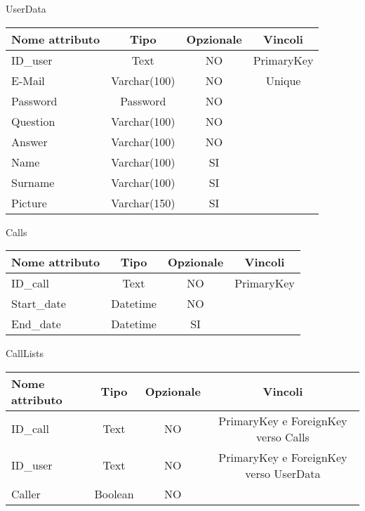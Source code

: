 \begin{center}

UserData

\begin{center}
\begin{tabular}{lccc}
\toprule
Nome attributo & Tipo & Opzionale & Vincoli\\
\midrule %
ID\_user & Text & NO & PrimaryKey\\
E-Mail & Varchar(100) & NO & Unique\\
Password & Password & NO &\\
Question & Varchar(100) & NO &\\
Answer & Varchar(100) & NO &\\
Name & Varchar(100) & SI &\\
Surname & Varchar(100) & SI &\\
Picture & Varchar(150) & SI &\\
\bottomrule
\end{tabular}
\end{center}

Calls

\begin{center}
\begin{tabular}{lccc}
\toprule
Nome attributo & Tipo & Opzionale & Vincoli\\
\midrule %
ID\_call & Text & NO & PrimaryKey\\
Start\_date & Datetime & NO & \\
End\_date & Datetime & SI &\\
\bottomrule
\end{tabular}
\end{center}

CallLists

\begin{center}
\begin{tabular}{lccc}
\toprule
Nome attributo & Tipo & Opzionale & Vincoli\\
\midrule %
ID\_call & Text & NO & PrimaryKey e ForeignKey verso Calls\\
ID\_user & Text & NO & PrimaryKey e ForeignKey verso UserData \\
Caller & Boolean & NO &\\
\bottomrule
\end{tabular}
\end{center}


\end{center}
